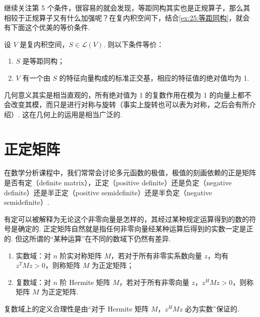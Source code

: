 继续关注第 5 个条件，很容易的就会发现，等距同构其实也是正规算子，那么其相较于正规算子又有什么加强呢？在复内积空间下，结合\autoref{ex:25:等距同构}，就会有下面这个优美的等价条件.

\begin{theorem}
    设 $ V $ 是复内积空间，$ S \in \mathcal{L}(V) $. 则以下条件等价：
    \begin{enumerate}
        \item $ S $ 是等距同构；

        \item $ V $ 有一个由 $ S $ 的特征向量构成的标准正交基，相应的特征值的绝对值均为 1.
    \end{enumerate}
\end{theorem}

几何意义其实是相当直观的，所有绝对值为 1 的复数作用在模为 1 的向量上都不会改变其模，而只是进行对称与旋转（事实上旋转也可以表为对称，之后会有所介绍）. 这在几何上的运用是相当广泛的.

\section{正定矩阵}

在数学分析课程中，我们常常会讨论多元函数的极值，极值的刻画依赖的正是矩阵是否有定（definite matrix），正定（positive definite）还是负定（negative definite）还是半正定（positive semidefinite）还是半负定（negative semidefinite）.

有定可以被解释为无论这个非零向量是怎样的，其经过某种规定运算得到的数的符号是确定的. 正定矩阵自然就是指任何非零向量经某种运算后得到的实数一定是正的. 但这所谓的``某种运算''在不同的数域下仍然有差异.

\begin{definition}[正定矩阵] 
    \begin{enumerate}
        \item 实数域：对 $ n $ 阶实对称矩阵 $ M $，若对于所有非零实系数向量 $ z $，均有$ z^{T}Mz > 0 $，则称矩阵 $ M $ 为正定矩阵；

        \item 复数域：对 $ n $ 阶 Hermite 矩阵 $ M $，若对于所有非零向量 $ z $，$ z^{H}Mz > 0 $，则称矩阵 $ M $ 为正定矩阵.
    \end{enumerate}
\end{definition}

复数域上的定义合理性是由``对于 Hermite 矩阵 $ M $，$ z^{H}Mz $ 必为实数''保证的.

